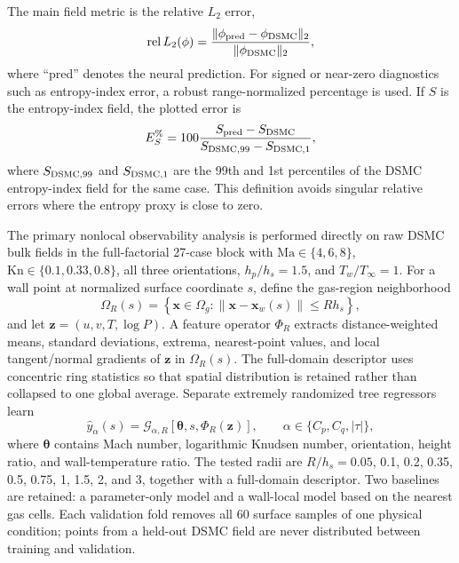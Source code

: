 \documentclass[aip,pof,preprint,notitlepage,floatfix,amsmath,amssymb]{revtex4-2}
\newcommand{\Kn}{\mathrm{Kn}}
\newcommand{\Ma}{\mathrm{Ma}}
\newcommand{\relLtwo}{\mathrm{rel}\,L_2}
\begin{document}
The main field metric is the relative $L_2$ error,
\begin{equation}
 \relLtwo(\phi)=\frac{\|\phi_{\rm pred}-\phi_{\rm DSMC}\|_2}{\|\phi_{\rm DSMC}\|_2},
\end{equation}
where ``pred'' denotes the neural prediction. For signed or near-zero diagnostics such as entropy-index error, a robust range-normalized percentage is used. If $S$ is the entropy-index field, the plotted error is
\begin{equation}
 E_S^{\%}=100\frac{S_{\rm pred}-S_{\rm DSMC}}{S_{{\rm DSMC},99}-S_{{\rm DSMC},1}},
\end{equation}
where $S_{{\rm DSMC},99}$ and $S_{{\rm DSMC},1}$ are the 99th and 1st percentiles of the DSMC entropy-index field for the same case. This definition avoids singular relative errors where the entropy proxy is close to zero.


The primary nonlocal observability analysis is performed directly on raw DSMC bulk fields in the full-factorial 27-case block with $\Ma\in\{4,6,8\}$, $\Kn\in\{0.1,0.33,0.8\}$, all three orientations, $h_p/h_s=1.5$, and $T_w/T_\infty=1$. For a wall point at normalized surface coordinate $s$, define the gas-region neighborhood
\begin{equation}
 \Omega_R(s)=\left\{\bm{x}\in\Omega_g:\|\bm{x}-\bm{x}_w(s)\|\le R h_s\right\},
\end{equation}
and let $\bm{z}=(u,v,T,\log P)$. A feature operator $\Phi_R$ extracts distance-weighted means, standard deviations, extrema, nearest-point values, and local tangent/normal gradients of $\bm{z}$ in $\Omega_R(s)$. The full-domain descriptor uses concentric ring statistics so that spatial distribution is retained rather than collapsed to one global average. Separate extremely randomized tree regressors\cite{Geurts2006} learn
\begin{equation}
 \widehat{y}_{\alpha}(s)=\mathcal{G}_{\alpha,R}\!\left[\bm{\theta},s,\Phi_R(\bm{z})\right],
 \qquad \alpha\in\{C_p,C_q,|\tau|\},
\end{equation}
where $\bm{\theta}$ contains Mach number, logarithmic Knudsen number, orientation, height ratio, and wall-temperature ratio. The tested radii are $R/h_s=0.05$, 0.1, 0.2, 0.35, 0.5, 0.75, 1, 1.5, 2, and 3, together with a full-domain descriptor. Two baselines are retained: a parameter-only model and a wall-local model based on the nearest gas cells. Each validation fold removes all 60 surface samples of one physical condition; points from a held-out DSMC field are never distributed between training and validation.
\end{document}
